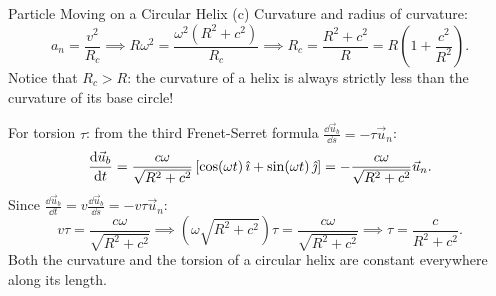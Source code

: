 \begin{workedexample}{Particle Moving on a Circular Helix}
(c) Curvature and radius of curvature:
\[
a_n = \frac{v^2}{R_c} \implies R\omega^2 = \frac{\omega^2(R^2 + c^2)}{R_c} \implies \boxed{R_c = \frac{R^2 + c^2}{R} = R\left(1 + \frac{c^2}{R^2}\right).}
\]
Notice that $R_c > R$: the curvature of a helix is always strictly less than the curvature of its base circle!

For torsion $\tau$: from the third Frenet-Serret formula $\frac{\dd\vec{u}_b}{\dd s} = -\tau\vec{u}_n$:
\[
\frac{\mathrm{d}\vec{u}_b}{\mathrm{d} t} = \frac{c\omega}{\sqrt{R^2 + c^2}}\left[ \cos(\omega t)\,\hat{\imath} + \sin(\omega t)\,\hat{\jmath} \right] = -\frac{c\omega}{\sqrt{R^2 + c^2}}\vec{u}_n.
\]
Since $\frac{\dd\vec{u}_b}{\dd t} = v\frac{\dd\vec{u}_b}{\dd s} = -v\tau\vec{u}_n$:
\[
v\tau = \frac{c\omega}{\sqrt{R^2 + c^2}} \implies \left(\omega\sqrt{R^2 + c^2}\right)\tau = \frac{c\omega}{\sqrt{R^2 + c^2}} \implies \boxed{\tau = \frac{c}{R^2 + c^2}.}
\]
Both the curvature and the torsion of a circular helix are constant everywhere along its length.
\end{workedexample}
